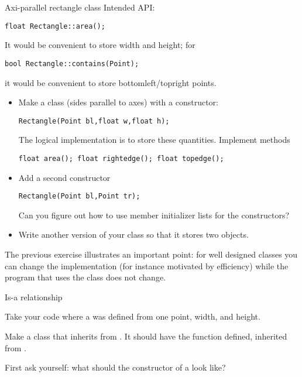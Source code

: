 \begin{block}{Axi-parallel rectangle class}
  \label{ex:geom:rect}
  Intended API:
\begin{lstlisting}
float Rectangle::area();
\end{lstlisting}
It would be convenient to store width and height; for 
\begin{lstlisting}
bool Rectangle::contains(Point);  
\end{lstlisting}
it would be convenient to store bottomleft/topright points.
\end{block}

\begin{exercise}
  \label{ex:geom:rect2}
  \begin{itemize}
  \item
    Make a class  (sides parallel to axes) with a constructor:
\begin{lstlisting}
Rectangle(Point bl,float w,float h);
\end{lstlisting}
The logical implementation is to store these quantities.
Implement methods
\begin{lstlisting}
float area(); float rightedge(); float topedge();
\end{lstlisting}
\item Add a second constructor
\begin{lstlisting}
Rectangle(Point bl,Point tr);
\end{lstlisting}
Can you figure out how to use member initializer lists for the constructors?
\item Write another version of your class so that it stores two  objects.
\end{itemize}
\end{exercise}

The previous exercise illustrates an important point: for well
designed classes you can change the implementation (for instance motivated
by efficiency) while the program that uses the class does not change.

 {Is-a relationship}
\label{sec:geom-isa}

\prerequisite{\ref{sec:inheritance}}

\begin{exercise}
  \label{ex:geom:square}
  Take your code where a  was defined from one point,
  width, and height.

  Make a class  that inherits from . It should
  have the function  defined, inherited from .

  First ask yourself: what should the constructor of a  look like?
\end{exercise}

